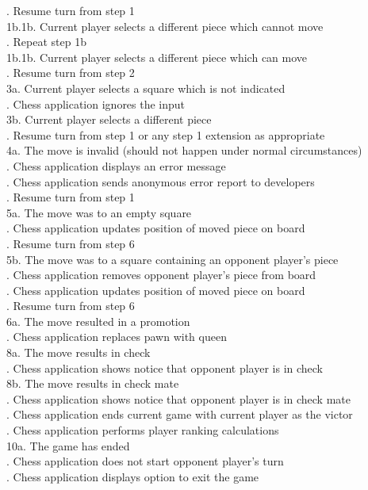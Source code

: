 \documentclass{article}
\begin{document}
\indent\indent{}. Resume turn from step 1\\
\indent\indent1b.1b. Current player selects a different piece which cannot move\\
\indent\indent{}. Repeat step 1b\\
\indent\indent1b.1b. Current player selects a different piece which can move\\
\indent\indent{}. Resume turn from step 2\\
3a. Current player selects a square which is not indicated\\
. Chess application ignores the input\\
3b. Current player selects a different piece\\
. Resume turn from step 1 or any step 1 extension as appropriate\\
4a. The move is invalid (should not happen under normal circumstances)\\
. Chess application displays an error message\\
. Chess application sends anonymous error report to developers\\
. Resume turn from step 1\\
5a. The move was to an empty square\\
. Chess application updates position of moved piece on board\\
. Resume turn from step 6\\
5b. The move was to a square containing an opponent player's piece\\
. Chess application removes opponent player's piece from board\\
. Chess application updates position of moved piece on board\\
. Resume turn from step 6\\
6a. The move resulted in a promotion\\
. Chess application replaces pawn with queen\\
8a. The move results in check\\
. Chess application shows notice that opponent player is in check\\
8b. The move results in check mate\\
. Chess application shows notice that opponent player is in check mate\\
. Chess application ends current game with current player as the victor\\
. Chess application performs player ranking calculations\\
10a. The game has ended\\
. Chess application does not start opponent player's turn\\
. Chess application displays option to exit the game\\
\end{document}
